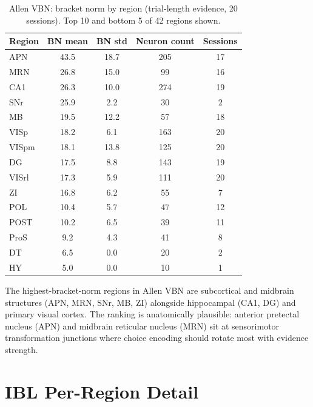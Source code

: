 \documentclass{article}
\begin{document}
\begin{table}[h]
\centering
\caption{Allen VBN: bracket norm by region (trial-length evidence, 20 sessions). Top 10 and bottom 5 of 42 regions shown.}
\label{tab:vbn_regions}
\small
\begin{tabular}{lcccc}
\toprule
Region & BN mean & BN std & Neuron count & Sessions \\
\midrule
APN & 43.5 & 18.7 & 205 & 17 \\
MRN & 26.8 & 15.0 & 99 & 16 \\
CA1 & 26.3 & 10.0 & 274 & 19 \\
SNr & 25.9 & 2.2 & 30 & 2 \\
MB & 19.5 & 12.2 & 57 & 18 \\
VISp & 18.2 & 6.1 & 163 & 20 \\
VISpm & 18.1 & 13.8 & 125 & 20 \\
DG & 17.5 & 8.8 & 143 & 19 \\
VISrl & 17.3 & 5.9 & 111 & 20 \\
ZI & 16.8 & 6.2 & 55 & 7 \\
\midrule
POL & 10.4 & 5.7 & 47 & 12 \\
POST & 10.2 & 6.5 & 39 & 11 \\
ProS & 9.2 & 4.3 & 41 & 8 \\
DT & 6.5 & 0.0 & 20 & 2 \\
HY & 5.0 & 0.0 & 10 & 1 \\
\bottomrule
\end{tabular}
\end{table}

The highest-bracket-norm regions in Allen VBN are subcortical and midbrain structures (APN, MRN, SNr, MB, ZI) alongside hippocampal (CA1, DG) and primary visual cortex. The ranking is anatomically plausible: anterior pretectal nucleus (APN) and midbrain reticular nucleus (MRN) sit at sensorimotor transformation junctions where choice encoding should rotate most with evidence strength.

\section{IBL Per-Region Detail}
\label{app:ibl}
\end{document}
